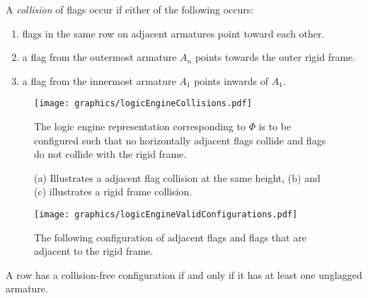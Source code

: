 A \textit{collision} of flags occur if either of the following occurs:
\begin{enumerate}
\item flags in the same row on adjacent armatures point toward each other.
\item a flag from the outermost armature $A_n$ points towards the outer rigid frame.
\item a flag from the innermost armature $A_1$ points inwards of $A_1$.
\end{enumerate}
\begin{figure}[!htbp]
\begin{center}
\texttt{[image: graphics/logicEngineCollisions.pdf]}
\caption{(a) Illustrates a adjacent flag collision at the same height, (b) and (c) illustrates a 
rigid frame collision.}\label{fig:logicEngineCollisions.pdf}
\end{center}
The logic engine representation corresponding to $\Phi$ is to be configured such that no 
horizontally adjacent flags collide and flags do not collide with the rigid frame. 
\end{figure}
\begin{figure}[!htbp]
\begin{center}
\texttt{[image: graphics/logicEngineValidConfigurations.pdf]}
\caption{The following configuration of adjacent flags 
and flags that are adjacent to the rigid frame.}\label{fig:logicEngineValidConfigurations.pdf}
\end{center}
\end{figure}
\begin{lem}\label{lem:logicEngine1}A row has a collision-free configuration if and only if it has 
at least one unglagged armature. \end{lem}
